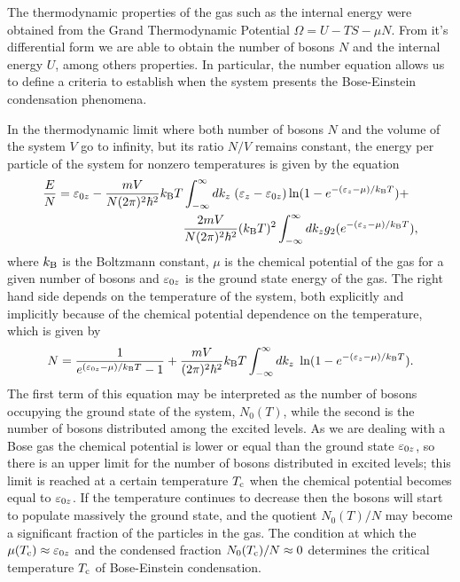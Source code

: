The thermodynamic properties of the gas such as the internal energy were
obtained from the Grand Thermodynamic Potential $\Omega = U - TS - \mu N$.
From it's differential form we are able to obtain the number of bosons $N$ and
the internal energy $U$, among others properties. In particular, the number
equation allows us to define a criteria to establish when the system presents
the Bose-Einstein condensation phenomena.

In the thermodynamic limit where both number of bosons $N$ and the volume of
the system $V$ go to infinity, but its ratio $N / V$ remains constant, the
energy per particle of the system for nonzero temperatures is given by the
equation
\cite{bib:rodriguez-msc-thesis.2014}
%
\begin{align}
	\label{eq:ideal-internal-energy}
	\nonumber \frac{E}{N} = \ez[0] - \frac{m V}{N (2\pi)^2 \hbar^2} \kbz T & \int_{-\infty}^{\infty} d\kz \; (\ez - \ez[0]) \ln(1 - e^{-(\ez - \mu) / \kbz T}) +                    \\
	                                                                       & \frac{2 m V}{N (2\pi)^2 \hbar^2} (\kbz T)^2 \int_{-\infty}^{\infty} d\kz g_2(e^{-(\ez - \mu)/\kbz T}),
\end{align}
%
where $\kbz$ is the Boltzmann constant, $\mu$ is the chemical potential of the
gas for a given number of bosons and $\ez[0]$ is the ground state energy of the
gas. The right hand side depends on the temperature of the system, both
explicitly and implicitly because of the chemical potential dependence on the
temperature, which is given by
%
\begin{equation}
	\label{eq:ideal-number-of-bosons}
	N = \frac{1}{e^{(\ez[0] - \mu)/\kbz T} - 1} + \frac{m V}{(2\pi)^2 \hbar^2} \kbz T \int_{-\infty}^{\infty} d\kz \; \ln(1 - e^{-(\ez - \mu)/\kbz T}).
\end{equation}
%
The first term of this equation may be interpreted as the number of bosons
occupying the ground state of the system, $N_0(T)$, while the second is the
number of bosons distributed among the excited levels. As we are dealing with a
Bose gas the chemical potential is lower or equal than the ground state
$\ez[0]$, so there is an upper limit for the number of bosons distributed in
excited levels; this limit is reached at a certain temperature $\Tcritic$ when
the chemical potential becomes equal to $\ez[0]$. If the temperature continues
to decrease then the bosons will start to populate massively the ground state,
and the quotient $N_0(T) / N$ may become a significant fraction of the particles
in the gas. The condition at which the $\mu(\Tcritic) \approx \ez[0]$ and the
condensed fraction $N_0(\Tcritic) / N \approx 0$ determines the critical
temperature $\Tcritic$ of Bose-Einstein condensation.

